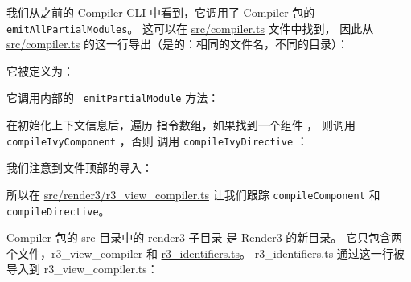 我们从之前的 Compiler-CLI 中看到，它调用了 Compiler 包的 \texttt{emitAllPartialModules}。
这可以在
\href{https://github.com/angular/angular/blob/master/packages/compiler/src/aot/compiler.ts}
{src/compiler.ts} 文件中找到，
因此从
\href{https://github.com/angular/angular/blob/master/packages/compiler/src/compiler.ts}
{src/compiler.ts} 的这一行导出（是的：相同的文件名，不同的目录）：




它被定义为：




它调用内部的 \texttt{\_emitPartialModule} 方法：




在初始化上下文信息后，遍历  指令数组，如果找到一个组件 ，
则调用 \texttt{compileIvyComponent} ，否则 调用 \texttt{compileIvyDirective} ：




我们注意到文件顶部的导入：




所以在
\href{https://github.com/angular/angular/blob/master/packages/compiler/src/render3/r3_view_compiler.ts}
{src/render3/r3\_view\_compiler.ts}
让我们跟踪 \texttt{compileComponent} 和 \texttt{compileDirective}。


Compiler 包的 src 目录中的
\href{https://github.com/angular/angular/tree/master/packages/compiler/src/render3}
{render3 子目录}
是 Render3 的新目录。
它只包含两个文件，r3\_view\_compiler 和
\href{https://github.com/angular/angular/blob/master/packages/compiler/src/render3/r3_identifiers.ts}
{r3\_identifiers.ts}。
r3\_identifiers.ts 通过这一行被导入到 r3\_view\_compiler.ts：

